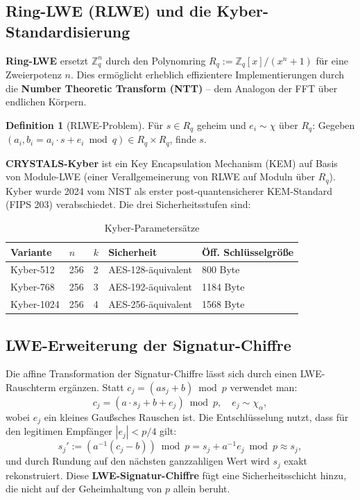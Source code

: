 ﻿\documentclass[a4paper,12pt]{scrreprt}
\theoremstyle{definition}
\newtheorem{definition}{Definition}[section]
\begin{document}
\subsection{Ring-LWE (RLWE) und die Kyber-Standardisierung}

\textbf{Ring-LWE} \cite{LPR10} ersetzt $\mathbb{Z}_q^n$ durch den Polynomring $R_q := \mathbb{Z}_q[x]/(x^n+1)$ für eine Zweierpotenz $n$. Dies ermöglicht erheblich effizientere Implementierungen durch die \textbf{Number Theoretic Transform (NTT)} -- dem Analogon der FFT über endlichen Körpern.

\begin{definition}[RLWE-Problem]
Für $s \in R_q$ geheim und $e_i \sim \chi$ über $R_q$: Gegeben $(a_i, b_i = a_i \cdot s + e_i \bmod q) \in R_q \times R_q$, finde $s$.
\end{definition}

\textbf{CRYSTALS-Kyber} \cite{ABD+22} ist ein Key Encapsulation Mechanism (KEM) auf Basis von Module-LWE (einer Verallgemeinerung von RLWE auf Moduln über $R_q$). Kyber wurde 2024 vom NIST \cite{NIST22} als erster post-quantensicherer KEM-Standard (FIPS 203) verabschiedet. Die drei Sicherheitsstufen sind:

\begin{table}[ht]
\centering
\caption{Kyber-Parametersätze}
\begin{tabular}{@{}lllll@{}}
\toprule
\textbf{Variante} & \textbf{$n$} & \textbf{$k$} & \textbf{Sicherheit} & \textbf{Öff. Schlüsselgröße} \\
\midrule
Kyber-512  & 256 & 2 & AES-128-äquivalent & 800 Byte \\
Kyber-768  & 256 & 3 & AES-192-äquivalent & 1184 Byte \\
Kyber-1024 & 256 & 4 & AES-256-äquivalent & 1568 Byte \\
\bottomrule
\end{tabular}
\end{table}

\subsection{LWE-Erweiterung der Signatur-Chiffre}

Die affine Transformation der Signatur-Chiffre lässt sich durch einen LWE-Rauschterm ergänzen. Statt $c_j = (a s_j + b)\bmod p$ verwendet man:
\[
c_j = (a \cdot s_j + b + e_j) \bmod p, \quad e_j \sim \chi_\alpha,
\]
wobei $e_j$ ein kleines Gaußsches Rauschen ist. Die Entschlüsselung nutzt, dass für den legitimen Empfänger $|e_j| < p/4$ gilt:
\[
s_j' := (a^{-1}(c_j - b))\bmod p = s_j + a^{-1}e_j \bmod p \approx s_j,
\]
und durch Rundung auf den nächsten ganzzahligen Wert wird $s_j$ exakt rekonstruiert. Diese \textbf{LWE-Signatur-Chiffre} fügt eine Sicherheitsschicht hinzu, die nicht auf der Geheimhaltung von $p$ allein beruht.
\end{document}
